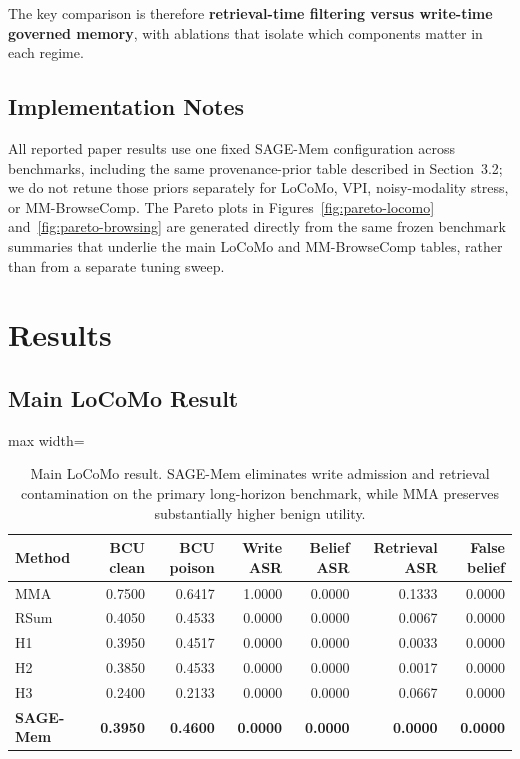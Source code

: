 \documentclass{article}
\begin{document}
The key comparison is therefore \textbf{retrieval-time filtering versus write-time governed memory}, with ablations that isolate which components matter in each regime.

\subsection{Implementation Notes}

All reported paper results use one fixed SAGE-Mem configuration across benchmarks, including the same provenance-prior table described in Section~3.2; we do not retune those priors separately for LoCoMo, VPI, noisy-modality stress, or MM-BrowseComp. The Pareto plots in Figures~\ref{fig:pareto-locomo} and~\ref{fig:pareto-browsing} are generated directly from the same frozen benchmark summaries that underlie the main LoCoMo and MM-BrowseComp tables, rather than from a separate tuning sweep.



\section{Results}

\subsection{Main LoCoMo Result}

\begin{table}[t]
\centering
\small
\setlength{\tabcolsep}{3.5pt}
\renewcommand{\arraystretch}{0.96}
\begin{adjustbox}{max width=\columnwidth}
\begin{tabular}{lrrrrrr}
\toprule
Method & BCU clean & BCU poison & Write ASR & Belief ASR & Retrieval ASR & False belief \\
\midrule
MMA & 0.7500 & 0.6417 & 1.0000 & 0.0000 & 0.1333 & 0.0000 \\
RSum & 0.4050 & 0.4533 & 0.0000 & 0.0000 & 0.0067 & 0.0000 \\
H1 & 0.3950 & 0.4517 & 0.0000 & 0.0000 & 0.0033 & 0.0000 \\
H2 & 0.3850 & 0.4533 & 0.0000 & 0.0000 & 0.0017 & 0.0000 \\
H3 & 0.2400 & 0.2133 & 0.0000 & 0.0000 & 0.0667 & 0.0000 \\
\textbf{SAGE-Mem} & \textbf{0.3950} & \textbf{0.4600} & \textbf{0.0000} & \textbf{0.0000} & \textbf{0.0000} & \textbf{0.0000} \\
\bottomrule
\end{tabular}
\end{adjustbox}
\caption{Main LoCoMo result. SAGE-Mem eliminates write admission and retrieval contamination on the primary long-horizon benchmark, while MMA preserves substantially higher benign utility.}
\label{tab:locomo-main}
\end{table}
\end{document}

